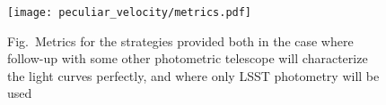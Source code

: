 \begin{figure}
    \begin{center}
        \texttt{[image: peculiar\_velocity/metrics.pdf]}
        \caption{Fig.~Metrics for the strategies provided both in the case where follow-up with some other photometric telescope will characterize the light curves perfectly, and where only LSST photometry will be used}
    \label{fig:cadence_metrics}
    \end{center}
\end{figure}




